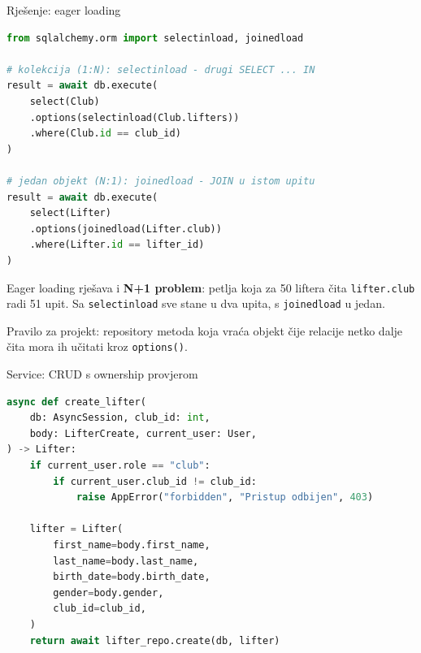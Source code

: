 \begin{frame}[fragile,shrink=10]{Rješenje: eager loading}
\begin{lstlisting}[language=python]
from sqlalchemy.orm import selectinload, joinedload

# kolekcija (1:N): selectinload - drugi SELECT ... IN
result = await db.execute(
    select(Club)
    .options(selectinload(Club.lifters))
    .where(Club.id == club_id)
)

# jedan objekt (N:1): joinedload - JOIN u istom upitu
result = await db.execute(
    select(Lifter)
    .options(joinedload(Lifter.club))
    .where(Lifter.id == lifter_id)
)
\end{lstlisting}

\vspace{0.4em}
Eager loading rješava i \textbf{N+1 problem}: petlja koja za 50 liftera čita \texttt{lifter.club} radi 51 upit. Sa \texttt{selectinload} sve stane u dva upita, s \texttt{joinedload} u jedan.

\vspace{0.4em}
Pravilo za projekt: repository metoda koja vraća objekt čije relacije netko dalje čita mora ih učitati kroz \texttt{options()}.
\end{frame}

\begin{frame}[fragile, shrink=5]{Service: CRUD s ownership provjerom}
\begin{lstlisting}[language=python]
async def create_lifter(
    db: AsyncSession, club_id: int,
    body: LifterCreate, current_user: User,
) -> Lifter:
    if current_user.role == "club":
        if current_user.club_id != club_id:
            raise AppError("forbidden", "Pristup odbijen", 403)

    lifter = Lifter(
        first_name=body.first_name,
        last_name=body.last_name,
        birth_date=body.birth_date,
        gender=body.gender,
        club_id=club_id,
    )
    return await lifter_repo.create(db, lifter)
\end{lstlisting}
\end{frame}

